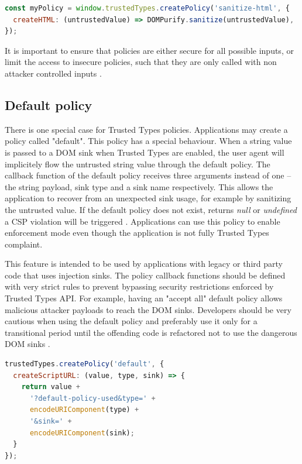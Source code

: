 \bigskip
\begin{lstlisting}[language=JavaScript, caption=Using a policy to sanitize HTML values]
const myPolicy = window.trustedTypes.createPolicy('sanitize-html', {
  createHTML: (untrustedValue) => DOMPurify.sanitize(untrustedValue),
});
\end{lstlisting}

It is important to ensure that policies are either secure for all possible inputs, or limit the
access to insecure policies, such that they are only called with non attacker controlled inputs
\cite{tt_spec:best_practice_policy}.

\subsection{Default policy}

There is one special case for Trusted Types policies. Applications may create a policy called
"default". This policy has a special behaviour. When a string value is passed to a DOM sink when
Trusted Types are enabled, the user agent will implicitely flow the untrusted string value through
the default policy. The callback function of the default policy receives three arguments instead of
one -- the string payload, sink type and a sink name respectively. This allows the application to
recover from an unexpected sink usage, for example by sanitizing the untrusted value. If the default
policy does not exist, returns \emph{null} or \emph{undefined} a CSP violation will be triggered
\cite{tt_spec:default_policy}. Applications can use this policy to enable enforcement mode even
though the application is not fully Trusted Types complaint.

This feature is intended to be used by applications with legacy or third party code that uses
injection sinks. The policy callback functions should be defined with very strict rules to prevent
bypassing security restrictions enforced by Trusted Types API. For example, having an "accept all"
default policy allows malicious attacker payloads to reach the DOM sinks. Developers should be very
cautious when using the default policy and preferably use it only for a transitional period until
the offending code is refactored not to use the dangerous DOM sinks \cite{tt_spec:default_policy}.

\bigskip
\begin{lstlisting}[language=JavaScript, caption=Creating a default policy \cite{tt_spec:default_policy}]
trustedTypes.createPolicy('default', {
  createScriptURL: (value, type, sink) => {
    return value +
      '?default-policy-used&type=' +
      encodeURIComponent(type) +
      '&sink=' +
      encodeURIComponent(sink);
  }
});
\end{lstlisting}

